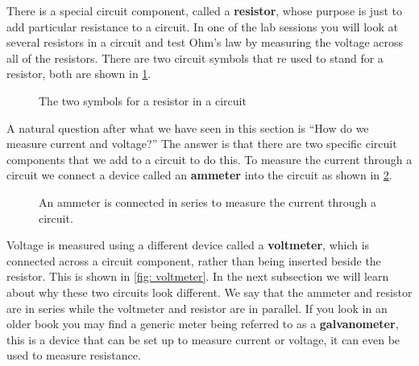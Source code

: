 \documentclass[a4paper,12pt]{book}
\begin{document}
There is a special circuit component, called a \textbf{resistor}, whose purpose is just to add particular resistance to a circuit. In one of the lab sessions you will look at several resistors in a circuit and test Ohm's law by measuring the voltage across all of the resistors.  There are two circuit symbols that re used to stand for a resistor, both are shown in \cref{fig: resistors}.

\begin{figure}[ht]
    \centering
    \caption{The two symbols for a resistor in a circuit}
    \label{fig: resistors}
\end{figure}

A natural question after what we have seen in this section is ``How do we measure current and voltage?'' The answer is that there are two specific circuit components that we add to a circuit to do this. To measure the current through a circuit we connect a device called an \textbf{ammeter} into the circuit as shown in \cref{fig: ammeter}.

\begin{figure}[ht]
    \centering
    \caption{An ammeter is connected in series to measure the current through a circuit.}
    \label{fig: ammeter}
\end{figure}

Voltage is measured using a different device called a \textbf{voltmeter}, which is connected across a circuit component, rather than  being inserted beside the resistor. This is shown in \cref{fig: voltmeter}. In the next subsection we will learn about why these two circuits look different. We say that the ammeter and resistor are in series while the voltmeter and resistor are in parallel. If you look in an older book you may find a generic meter being referred to as a \textbf{galvanometer}, this is a device that can be set up to measure current or voltage, it can even be used to measure resistance. 
\end{document}
